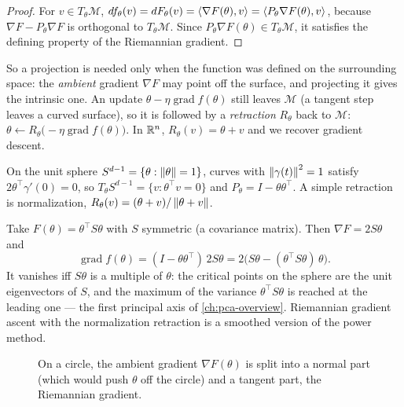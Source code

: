 \begin{notechapter}
\begin{proof}
For $v\in T_\theta\mathcal M$, $df_\theta(v) = dF_\theta(v) = \left\langle \nabla F(\theta), v \right\rangle = \left\langle P_\theta\nabla F(\theta), v \right\rangle$, because
$\nabla F - P_\theta\nabla F$ is orthogonal to $T_\theta\mathcal M$. Since $P_\theta\nabla F(\theta)\in T_\theta\mathcal M$, it satisfies the defining
property of the Riemannian gradient.
\end{proof}

So a projection is needed only when the function was defined on the surrounding space: the
\emph{ambient} gradient $\nabla F$ may point off the surface, and projecting it gives the intrinsic one.
An update $\theta - \eta\operatorname{grad}f(\theta)$ still leaves $\mathcal M$ (a tangent step leaves a curved surface), so it is
followed by a \emph{retraction} $R_\theta$ back to $\mathcal M$:
$\theta\leftarrow R_\theta\bigl(-\eta\operatorname{grad}f(\theta)\bigr)$. In $\mathbb{R}^n$, $R_\theta(v) = \theta + v$ and we recover gradient descent.

\begin{example}\label{gradient-tangent-space:ex:sphere}
On the unit sphere $S^{d-1} = \{\theta : \left\|\theta\right\| = 1\}$, curves with $\left\|\gamma(t)\right\|^2 = 1$ satisfy
$2\theta^\top\gamma'(0) = 0$, so $T_\theta S^{d-1} = \{v : \theta^\top v = 0\}$ and $P_\theta = I - \theta\theta^\top$. A simple retraction is
normalization, $R_\theta(v) = (\theta + v)/\left\|\theta + v\right\|$.

Take $F(\theta) = \theta^\top S\theta$ with $S$ symmetric (a covariance matrix). Then $\nabla F = 2S\theta$ and
\[
  \operatorname{grad}f(\theta) = (I - \theta\theta^\top)\,2S\theta = 2\bigl(S\theta - (\theta^\top S\theta)\,\theta\bigr).
\]
It vanishes iff $S\theta$ is a multiple of $\theta$: the critical points on the sphere are the unit eigenvectors
of $S$, and the maximum of the variance $\theta^\top S\theta$ is reached at the leading one --- the first principal
axis of \cref{ch:pca-overview}. Riemannian gradient ascent with the normalization retraction is
a smoothed version of the power method.
\end{example}

\begin{figure}[ht]
\centering
{}
\caption{On a circle, the ambient gradient $\nabla F(\theta)$ is split into a normal part (which would push
$\theta$ off the circle) and a tangent part, the Riemannian gradient.}
\label{gradient-tangent-space:fig:sphere}
\end{figure}


\end{notechapter}
